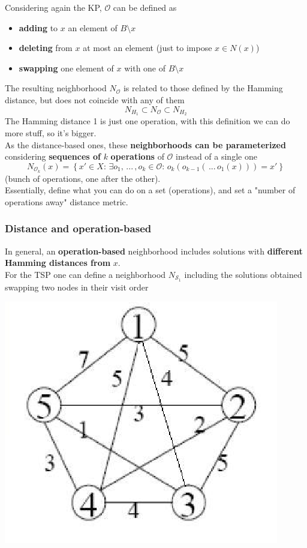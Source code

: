 \documentclass[11pt]{article}
\begin{document}
	Considering again the KP, $\mathcal{O}$ can be defined as
	\begin{itemize}
		\item \textbf{adding} to $x$ an element of $B \setminus x$
		
		\item \textbf{deleting} from $x$ at most an element (just to impose $x \in N (x)$)
		
		\item \textbf{swapping} one element of $x$ with one of $B \setminus x$
	\end{itemize}
	
	The resulting neighborhood $N_{\mathcal{O}}$ is related to those defined by the Hamming distance, but does not coincide with any of them
	$$ N_{H_1} \subset N_{\mathcal{O}} \subset N_{H_2} $$
	The Hamming distance 1 is just one operation, with this definition we can do more stuff, so it's bigger.\\
	
	As the distance-based ones, these \textbf{neighborhoods can be parameterized} considering \textbf{sequences of} $k$ \textbf{operations} of $\mathcal{O}$ instead of a single one
	$$ N_{\mathcal{O}_k} (x) = \left\{ x' \in X : \, \exists o_1, \, ... \, , o_k \in \mathcal{O} : \, o_k (o_{k-1} ( \, ... \, o_1 (x))) = x' \right\} $$ 
	(bunch of operations, one after the other).\\
	
	Essentially, define what you can do on a set (operations), and set a "number of operations away" distance metric.\\	
	
	\newpage
	
	\subsubsection{Distance and operation-based}
	
	In general, an \textbf{operation-based} neighborhood includes solutions with \textbf{different Hamming distances from} $x$.\\
	
	For the TSP one can define a neighborhood $N_{\mathcal{S}_1}$ including the solutions obtained swapping two nodes in their visit order
	
	\begin{center}
		\includegraphics[width=0.5\columnwidth]{img/TSP2}
	\end{center}
	
\end{document}
